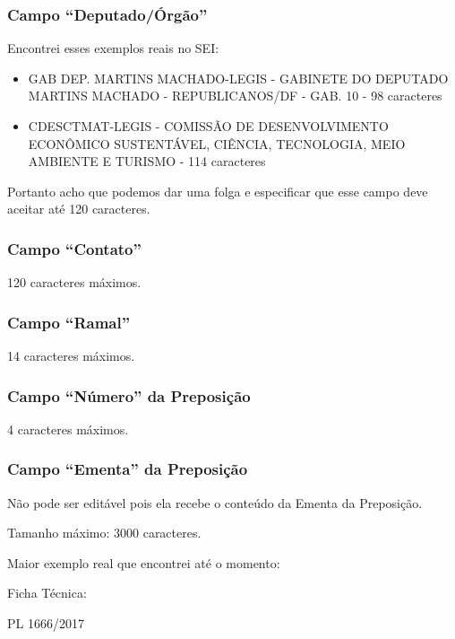 \subsubsection{Campo ``Deputado/Órgão''}

	Encontrei esses exemplos reais no SEI:
	\begin{itemize}
		\item GAB DEP. MARTINS MACHADO-LEGIS - GABINETE DO DEPUTADO MARTINS MACHADO - REPUBLICANOS/DF - GAB. 10 - 98 caracteres
		\item CDESCTMAT-LEGIS - COMISSÃO DE DESENVOLVIMENTO ECONÔMICO SUSTENTÁVEL, CIÊNCIA, TECNOLOGIA, MEIO AMBIENTE E TURISMO - 114 caracteres    
	\end{itemize}

	Portanto acho que podemos dar uma folga e especificar que esse campo deve aceitar até 120 caracteres.

\subsubsection{Campo ``Contato''}

120 caracteres máximos.

\subsubsection{Campo ``Ramal''}

14 caracteres máximos.

\subsubsection{Campo ``Número'' da Preposição}


4 caracteres máximos.

\subsubsection{Campo ``Ementa'' da Preposição}

Não pode ser editável pois ela recebe o conteúdo da Ementa da Preposição.

Tamanho máximo: 3000 caracteres.

Maior exemplo real que encontrei até o momento:

Ficha Técnica:

PL 1666/2017

